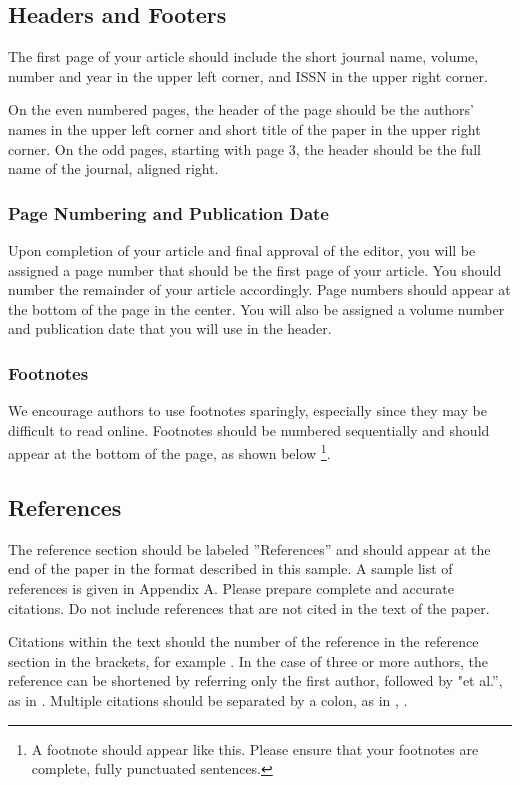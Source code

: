 \documentclass[twoside, 11pt, a4paper]{article}
\begin{document}
\subsection{Headers and Footers}

The first page of your article should include the short journal name, volume, number and year in the upper left corner, and ISSN in the upper right corner. 

On the even numbered pages, the header of the page should be the authors' names in the upper left corner and short title of the paper in the upper right corner. On the odd pages, starting with page 3, the header should be the full name of the journal, aligned right. 

\subsubsection{Page Numbering and Publication Date}

Upon completion of your article and final approval of the editor, you will be assigned a page number that should be the first page of your article. You should number the remainder of your article accordingly. Page numbers should appear at the bottom of the page in the center. You will also be 
assigned a volume number and publication date that you will use in the header. 

\subsubsection{Footnotes}

We encourage authors to use footnotes sparingly, especially since they may be difficult to read online. Footnotes should be numbered sequentially and should appear at the bottom of the page, as shown below \footnote{A footnote should appear like this. Please ensure that your footnotes are complete, fully punctuated sentences.}.  

\subsection{References}

The reference section should be labeled ''References'' and should appear at the end of the paper in the format described in this sample. A sample list of references is given in Appendix A. Please prepare complete and accurate citations. Do not include references that are not cited in the text of the paper.

Citations within the text should the number of the reference in the reference section in the brackets, for example \cite{1}. In the case of three or more authors, the reference can be shortened by referring only the first author, followed by "et al.'', as in \cite{2}. Multiple citations should be separated by a colon, as in \cite{1}, \cite{2}. 
\end{document}
